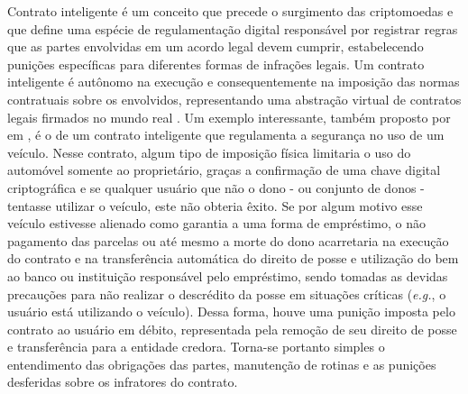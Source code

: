 Contrato inteligente é um conceito que precede o surgimento das criptomoedas e que define uma espécie de regulamentação digital responsável por registrar regras que as partes envolvidas em um acordo legal devem cumprir, estabelecendo punições específicas para diferentes formas de infrações legais. Um contrato inteligente é autônomo na execução e consequentemente na imposição das normas contratuais sobre os envolvidos, representando uma abstração virtual de contratos legais firmados no mundo real \cite{smart_contracts:szabo}. Um exemplo interessante, também proposto por  \citeauthor{smart_contracts:szabo} em \citeyear{smart_contracts:szabo}, é o de um contrato inteligente que regulamenta a segurança no uso de um veículo. Nesse contrato, algum tipo de imposição física limitaria o uso do automóvel somente ao proprietário, graças a confirmação de uma chave digital criptográfica e se qualquer usuário que não o dono - ou conjunto de donos - tentasse utilizar o veículo, este não obteria êxito. Se por algum motivo esse veículo estivesse alienado como garantia a uma forma de empréstimo, o não pagamento das parcelas ou até mesmo a morte do dono acarretaria na execução do contrato e na transferência automática do direito de posse e utilização do bem ao banco ou instituição responsável pelo empréstimo, sendo tomadas as devidas precauções para não realizar o descrédito da posse em situações críticas (\textit{e.g.}, o usuário está utilizando o veículo). Dessa forma, houve uma punição imposta pelo contrato ao usuário em débito, representada pela remoção de seu direito de posse e transferência para a entidade credora. Torna-se portanto simples o entendimento das obrigações das partes, manutenção de rotinas e as punições desferidas sobre os infratores do contrato.

